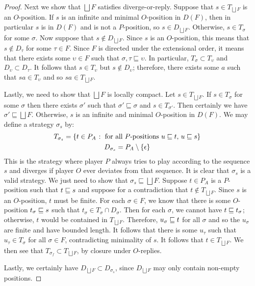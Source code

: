 \documentclass{article}
\newcommand{\exle}{\sqsubseteq}
\newcommand{\exlub}{\bigsqcup}
\begin{document}
\begin{proposition}
\begin{proof}
    Next we show that $\exlub F$ satisfies diverge-or-reply.  Suppose that $s\in T_{\exlub F}$ is an $O$-position.  If $s$ is an infinite and minimal $O$-position in $D(F)$, then in particular $s$ is in $D(F)$ and is not a $P$-position, so $s\in D_{\exlub F}$.  Otherwise, $s\in T_\sigma$ for some $\sigma$.  Now suppose that $s\not\in D_{\exlub F}$.  Since $s$ is an $O$-position, this means that $s\not\in D_\tau$ for some $\tau\in F$.  Since $F$ is directed under the extensional order, it means that there exists some $\upsilon\in F$ such that $\sigma,\tau\exle\upsilon$.  In particular, $T_\sigma\subset T_\upsilon$ and $D_\upsilon\subset D_\tau$.  It follows that $s\in T_\upsilon$ but $s\not\in D_\upsilon$; therefore, there exists some $a$ such that $sa\in T_\upsilon$ and so $sa\in T_{\exlub F}$.  

    Lastly, we need to show that $\exlub F$ is locally compact.  Let $s\in T_{\exlub F}$.  If $s\in T_\sigma$ for some $\sigma$ then there exists $\sigma'$ such that $\sigma'\exle\sigma$ and $s\in T_{\sigma'}$.  Then certainly we have $\sigma'\exle\exlub F$.  Otherwise, $s$ is an infinite and minimal $O$-position in $D(F)$.  We may define a strategy $\sigma_s$ by:
    \begin{gather*}
      T_{\sigma_s} = \{t\in P_A\;\colon\;\textrm{for all $P$-positions $u\sqsubseteq t$, $u\sqsubseteq s$}\} \\
      D_{\sigma_s} = P_A \setminus \{\epsilon\}
    \end{gather*}
    This is the strategy where player $P$ always tries to play according to the sequence $s$ and diverges if player $O$ ever deviates from that sequence.  It is clear that $\sigma_s$ is a valid strategy.  We just need to show that $\sigma_s\exle \exlub F$.  Suppose $t\in P_A$ is a $P$-position such that $t\sqsubseteq s$ and suppose for a contradiction that $t\not\in T_{\exlub F}$.  Since $s$ is an $O$-position, $t$ must be finite.  For each $\sigma\in F$, we know that there is some $O$-position $t_\sigma\sqsubseteq s$ such that $t_\sigma\in T_\sigma\cap D_\sigma$.  Then for each $\sigma$, we cannot have $t\sqsubseteq t_\sigma$; otherwise, $t$ would be contained in $T_{\exlub F}$.  Therefore, $u_\sigma\sqsubseteq t$ for all $\sigma$ and so the $u_\sigma$ are finite and have bounded length.  It follows that there is some $u_\tau$ such that $u_\tau\in T_\sigma$ for all $\sigma\in F$, contradicting minimality of $s$.  It follows that $t\in T_{\exlub F}$.  We then see that $T_{\sigma_f}\subset T_{\exlub F}$, by closure under $O$-replies.

    Lastly, we certainly have $D_{\exlub F}\subset D_{\sigma_s}$, since $D_{\exlub F}$ may only contain non-empty positions.
  \end{proof}
\end{proposition}
\end{document}
